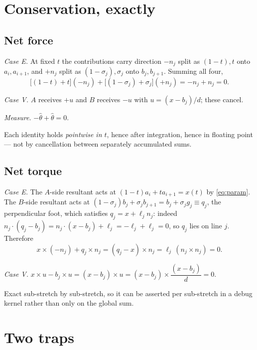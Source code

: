 \documentclass[11pt]{article}
\newcommand{\that}{\hat\theta}
\begin{document}
\section{Conservation, exactly}
\label{sec:conservation}

\subsection{Net force}

\emph{Case E.} At fixed $t$ the contributions carry direction $-n_j$ split as $(1-t),t$ onto $a_i,a_{i+1}$, and $+n_j$ split as $(1-\sigma_j),\sigma_j$ onto $b_j,b_{j+1}$. Summing all four,
\begin{equation}
\big[(1-t)+t\big](-n_j) + \big[(1-\sigma_j)+\sigma_j\big](+n_j) = -n_j + n_j = 0 .
\end{equation}

\emph{Case V.} $A$ receives $+u$ and $B$ receives $-u$ with $u = (x-b_j)/d$; these cancel.

\emph{Measure.} $-\that + \that = 0$.

Each identity holds \emph{pointwise in $t$}, hence after integration, hence in floating point --- not by cancellation between separately accumulated sums.

\subsection{Net torque}

\emph{Case E.} The $A$-side resultant acts at $(1-t)a_i + ta_{i+1} = x(t)$ by \eqref{eq:param}. The $B$-side resultant acts at $(1-\sigma_j)b_j + \sigma_jb_{j+1} = b_j + \sigma_jg_j \equiv q_j$, the perpendicular foot, which satisfies $q_j = x + \ell_jn_j$: indeed $n_j\cdot(q_j-b_j) = n_j\cdot(x-b_j) + \ell_j = -\ell_j + \ell_j = 0$, so $q_j$ lies on line $j$. Therefore
\begin{equation}
x\times(-n_j) + q_j\times n_j = (q_j-x)\times n_j = \ell_j\,(n_j\times n_j) = 0 .
\end{equation}

\emph{Case V.} $x\times u - b_j\times u = (x-b_j)\times u = (x-b_j)\times\dfrac{(x-b_j)}{d} = 0$.

Exact sub-stretch by sub-stretch, so it can be asserted per sub-stretch in a debug kernel rather than only on the global sum.

\section{Two traps}
\label{sec:traps}
\end{document}
